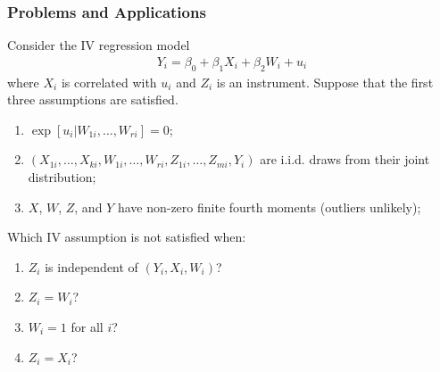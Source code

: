 

\begin{frame}
\frametitle{Problems and Applications}
Consider the IV regression model
\begin{align*}
Y_{i} = \beta_{0} + \beta_{1} X_{i} + \beta_{2} W_{i} + u_{i}
\end{align*}
where $X_{i}$ is correlated with $u_{i}$ and $Z_{i}$ is an instrument. Suppose that the first three assumptions are satisfied. 
\begin{enumerate}
\item<1-> $\exp[u_{i}|W_{1i},\ldots,W_{ri}]=0$;
\item<1-> $(X_{1i},\ldots,X_{ki},W_{1i},\ldots,W_{ri},Z_{1i},\ldots,Z_{mi},Y_{i})$ are i.i.d. draws from their joint distribution;
\item $X$, $W$, $Z$, and $Y$ have non-zero finite fourth moments (outliers unlikely);
\end{enumerate}
Which IV assumption is not satisfied when:
\begin{enumerate}
\item<1-> $Z_{i}$ is independent of $(Y_{i}, X_{i}, W_{i})$?
\item<1-> $Z_{i}=W_{i}$?
\item<1-> $W_{i}=1$ for all $i$?
\item<1-> $Z_{i}=X_{i}$?
\end{enumerate}
\end{frame}

